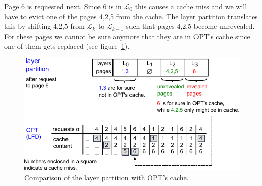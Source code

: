 \documentclass[a4paper,12pt, titlepage]{article}  %
\newcommand{\cl}{\mathcal{L}}   %
\begin{document}
\newpage
\noindent Page 6 is requested next. Since 6 is in $\cl_0$ this causes a cache miss and we will have to evict one of 
the pages 4,2,5 from the cache. The layer partition translates this by shifting 4,2,5 from $\cl_k$ to $\cl_{k-1}$ such that 
 pages 4,2,5 become unrevealed. For these pages we cannot be sure anymore that they are in OPT's cache since one of them
gets replaced (see figure~\ref{fig:layerPartition_Interpretation1b}).

\begin{figure}[!htp]
	\begin{center}
	\includegraphics[scale=1.1]{./figures/layerPartition_Interpretation1b.pdf}
	\caption{Comparison of the layer partition with OPT's cache.} 
	\label{fig:layerPartition_Interpretation1b}
        \end{center}
\end{figure}
\end{document}
